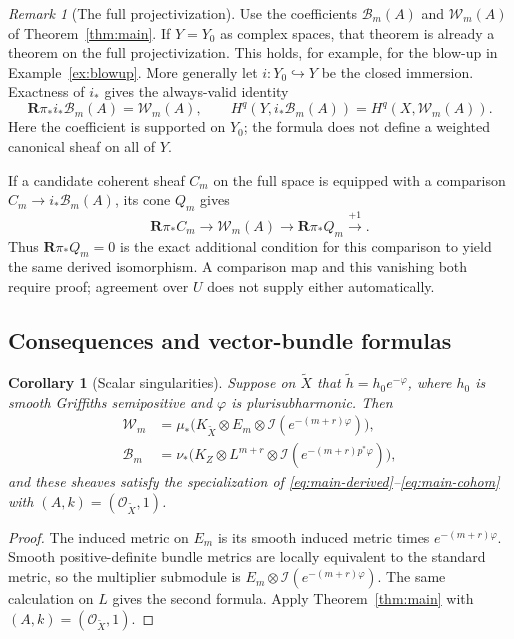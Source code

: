 \documentclass[11pt,reqno]{amsart}
\numberwithin{equation}{section}
\newtheorem{corollary}[theorem]{Corollary}
\theoremstyle{definition}
\theoremstyle{remark}
\newtheorem{remark}[theorem]{Remark}
\newcommand{\OO}{\mathcal O}
\newcommand{\II}{\mathcal I}
\newcommand{\WW}{\mathcal W}
\newcommand{\BB}{\mathcal B}
\newcommand{\RR}{\mathbf R}
\begin{document}
\begin{remark}[The full projectivization]\label{rem:full-space}
Use the coefficients $\BB_m(A)$ and $\WW_m(A)$ of Theorem~\ref{thm:main}. If $Y=Y_0$ as complex spaces, that theorem is already a theorem on the full projectivization. This holds, for example, for the blow-up in Example~\ref{ex:blowup}. More generally let $i:Y_0\hookrightarrow Y$ be the closed immersion. Exactness of $i_*$ gives the always-valid identity
\begin{equation}\label{eq:supported}
 \RR\pi_*i_*\BB_m(A)=\WW_m(A),
 \qquad H^q(Y,i_*\BB_m(A))=H^q(X,\WW_m(A)).
\end{equation}
Here the coefficient is supported on $Y_0$; the formula does not define a weighted canonical sheaf on all of $Y$.

If a candidate coherent sheaf $C_m$ on the full space is equipped with a comparison $C_m\to i_*\BB_m(A)$, its cone $Q_m$ gives
\begin{equation}\label{eq:full-defect}
 \RR\pi_*C_m\longrightarrow\WW_m(A)\longrightarrow\RR\pi_*Q_m\xrightarrow{+1}.
\end{equation}
Thus $\RR\pi_*Q_m=0$ is the exact additional condition for this comparison to yield the same derived isomorphism. A comparison map and this vanishing both require proof; agreement over $U$ does not supply either automatically.
\end{remark}

\subsection{Consequences and vector-bundle formulas}
\begin{corollary}[Scalar singularities]\label{cor:scalar}
Suppose on $\widetilde X$ that $\widetilde h=h_0e^{-\varphi}$, where $h_0$ is smooth Griffiths semipositive and $\varphi$ is plurisubharmonic. Then
\begin{align*}
 \WW_m&=\mu_*\bigl(K_{\widetilde X}\otimes E_m
                \otimes\II(e^{-(m+r)\varphi})\bigr),\\
 \BB_m&=\nu_*\bigl(K_Z\otimes L^{m+r}
                \otimes\II(e^{-(m+r)p^*\varphi})\bigr),
\end{align*}
and these sheaves satisfy the specialization of \eqref{eq:main-derived}--\eqref{eq:main-cohom} with $(A,k)=(\OO_{\widetilde X},1)$.
\end{corollary}
\begin{proof}
The induced metric on $E_m$ is its smooth induced metric times $e^{-(m+r)\varphi}$. Smooth positive-definite bundle metrics are locally equivalent to the standard metric, so the multiplier submodule is $E_m\otimes\II(e^{-(m+r)\varphi})$. The same calculation on $L$ gives the second formula. Apply Theorem~\ref{thm:main} with $(A,k)=(\OO_{\widetilde X},1)$.
\end{proof}
\end{document}
